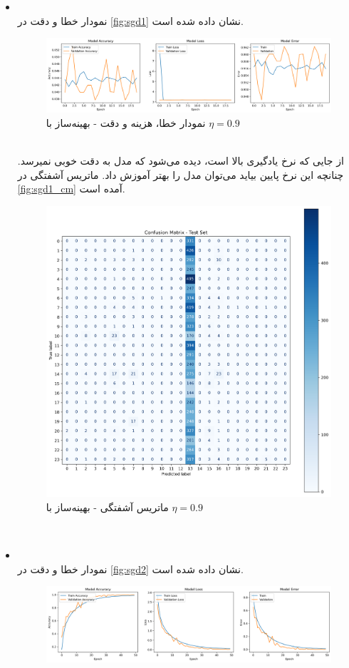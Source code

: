 \documentclass[11pt]{article}
\begin{document}
	\begin{itemize}
		\item {}\\
		نمودار خطا و دقت در 
		\autoref{fig:sgd1}
		نشان داده شده است.
		\begin{figure}[!h]
			\centerline{\includegraphics[width=1\linewidth]{../HW3_1/sgd1.png}}
			\caption{نمودار خطا، هزینه و دقت - بهینه‌ساز  با $\eta=0.9$}
			\label{fig:sgd1}
		\end{figure}\\
		از جایی که نرخ یادگیری بالا است، دیده می‌شود که مدل به دقت خوبی نمیرسد. چنانچه این نرخ پایین بیاید می‌توان مدل را بهتر آموزش داد. ماتریس آشفتگی در
		\autoref{fig:sgd1_cm}
	آمده است.
		\begin{figure}[!h]
			\centerline{\includegraphics[width=0.5\linewidth]{../HW3_1/sgd1 cm.png}}
			\caption{ماتریس آشفتگی - بهینه‌ساز  با $\eta=0.9$}
			\label{fig:sgd1_cm}
		\end{figure}\\
		\pagebreak
			\item {}\\
	نمودار خطا و دقت در 
	\autoref{fig:sgd2}
	نشان داده شده است.
	\begin{figure}[!h]
		\centerline{\includegraphics[width=1\linewidth]{../HW3_1/sgd2.png}}

\end{figure}
\end{itemize}
\end{document}
